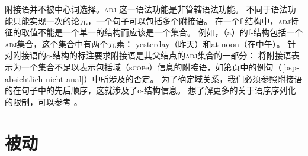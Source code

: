 附接语并不被中心词选择。\textsc{adj}
这一语法功能是非管辖语法功能。
不同于语法功能只能实现一次的论元，一个句子可以包括多个附接语。
在一个f-结构中，\textsc{adj}特征的取值不能是一个单一的结构而应该是一个集合。
例如，（a）的f-结构包括一个\textsc{adj}集合，这个集合中有两个元素：
yesterday（昨天）和at noon（在中午）。
\eal
{}
\ex\label{fstruc-david-devoured-a-sandwich-at-noon-yesterday} 
\zl
%
针对附接语的c-结构的标注要求附接语是其父结点的\textsc{adj}集合的一部分：
\ea
{}
\z
将附接语表示为一个集合不足以表示包括域（s\textsc{cop}e）信息的附接语，如第\pageref{bsp-absichtlich-nicht-anal}页中的例句（\ref{bsp-absichtlich-nicht-anal}）中所涉及的否定。
为了确定域关系，我们必须参照附接语的在句子中的先后顺序，这就涉及了c-结构信息。
想了解更多的关于语序序列化的限制，可以参考 。

\section{被动}
\label{Abschnitt-LFG-Passiv}


